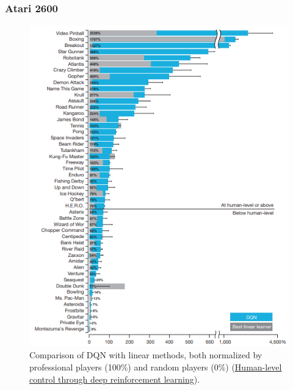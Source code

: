 \documentclass{beamer}
\begin{document}
        \begin{frame}
            \frametitle{Atari 2600}
            
            \begin{figure}[]
                \centering
                \includegraphics[height=0.7\textheight]{figures/comparison1}
                \caption{Comparison of DQN with linear methods, both normalized by professional players (100\%) and random players (0\%) (\href{https://storage.googleapis.com/deepmind-data/assets/papers/DeepMindNature14236Paper.pdf}{Human-level control through deep reinforcement learning}).}
                \label{fig12:atari}
            \end{figure}
        
        \end{frame}
\end{document}
